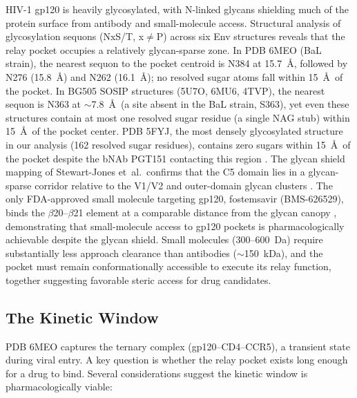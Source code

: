 \documentclass[11pt,a4paper]{article}
\begin{document}
HIV-1 gp120 is heavily glycosylated, with N-linked glycans shielding much of the protein surface from antibody and small-molecule access. Structural analysis of glycosylation sequons (NxS/T, x$\neq$P) across six Env structures reveals that the relay pocket occupies a relatively glycan-sparse zone. In PDB 6MEO (BaL strain), the nearest sequon to the pocket centroid is N384 at 15.7~\AA, followed by N276 (15.8~\AA) and N262 (16.1~\AA); no resolved sugar atoms fall within 15~\AA\ of the pocket. In BG505 SOSIP structures (5U7O, 6MU6, 4TVP), the nearest sequon is N363 at ${\sim}$7.8~\AA\ (a site absent in the BaL strain, S363), yet even these structures contain at most one resolved sugar residue (a single NAG stub) within 15~\AA\ of the pocket center. PDB 5FYJ, the most densely glycosylated structure in our analysis (162 resolved sugar residues), contains zero sugars within 15~\AA\ of the pocket despite the bNAb PGT151 contacting this region \citep{Lee2016}. The glycan shield mapping of Stewart-Jones et~al.\ confirms that the C5 domain lies in a glycan-sparse corridor relative to the V1/V2 and outer-domain glycan clusters \citep{StewartJones2016}. The only FDA-approved small molecule targeting gp120, fostemsavir (BMS-626529), binds the $\beta$20--$\beta$21 element at a comparable distance from the glycan canopy \citep{Pancera2017}, demonstrating that small-molecule access to gp120 pockets is pharmacologically achievable despite the glycan shield. Small molecules (300--600~Da) require substantially less approach clearance than antibodies (${\sim}$150~kDa), and the pocket must remain conformationally accessible to execute its relay function, together suggesting favorable steric access for drug candidates.

\subsection{The Kinetic Window}

PDB 6MEO captures the ternary complex (gp120--CD4--CCR5), a transient state during viral entry. A key question is whether the relay pocket exists long enough for a drug to bind. Several considerations suggest the kinetic window is pharmacologically viable:
\end{document}
